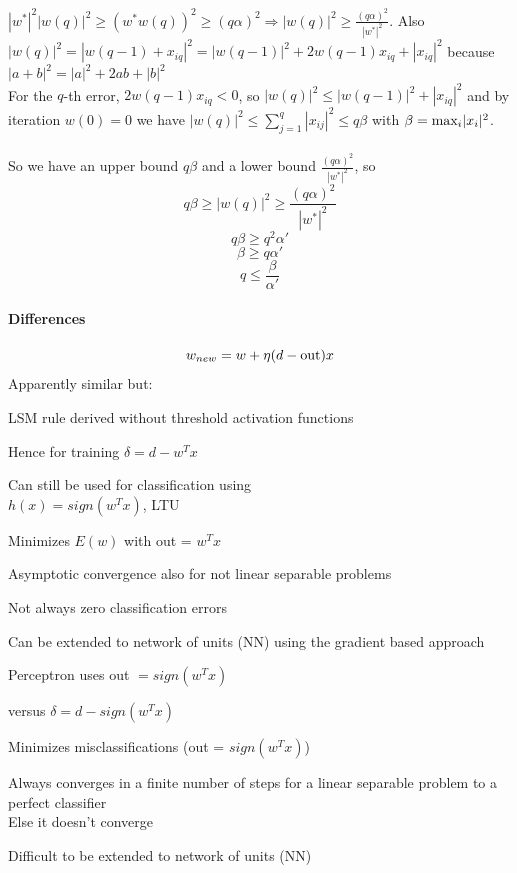 \documentclass[10pt]{report}
\begin{document}
$|w^*|^2|w(q)|^2 \geq (w^*w(q))^2 \geq (q\alpha)^2 \Rightarrow |w(q)|^2 \geq \frac{(q\alpha)^2}{|w^*|^2}$. Also $|w(q)|^2 = |w(q-1)+ x_{iq}|^2 = |w(q-1)|^2 + 2w(q-1)x_{iq} + |x_{iq}|^2$ because $|a + b|^2 = |a|^2 + 2ab + |b|^2$\\
For the $q$-th error, $2w(q-1)x_{iq} < 0$, so $|w(q)|^2 \leq |w(q-1)|^2 + |x_{iq}|^2$ and by iteration $w(0) = 0$ we have $|w(q)|^2 \leq \sum_{j=1}^q |x_{ij}|^2 \leq q\beta$ with $\beta = \hbox{max}_i |x_i|^2$.\\\\
So we have an upper bound $q\beta$ and a lower bound $\frac{(q\alpha)^2}{|w^*|^2}$, so $$q\beta\geq |w(q)|^2\geq \frac{(q\alpha)^2}{|w^*|^2}$$ $$q\beta\geq q^2\alpha'$$ $$\beta\geq q\alpha'$$ $$q \leq \frac{\beta}{\alpha'}$$
\paragraph{Differences}
	$$w_{new} = w + \eta(d-\hbox{out})x$$
Apparently similar but:
\begin{multicols}{2}
	\begin{list}{}{\textbf{LMS algorithm}}
		\item LSM rule derived without threshold activation functions
		\item Hence for training $\delta = d - w^Tx$
		\item Can still be used for classification using\\$h(x) = sign(w^T x)$, LTU
		\item Minimizes $E(w)$ with out = $w^Tx$
		\item Asymptotic convergence also for not linear separable problems
		\item Not always zero classification errors
		\item Can be extended to network of units (NN) using the gradient based approach
	\end{list}
	\begin{list}{}{\textbf{Perceptron learning algorithm}}
		\item Perceptron uses out $= sign(w^Tx)$
		\item versus $\delta = d - sign(w^Tx)$
		\item
		\item Minimizes misclassifications (out = $sign(w^Tx)$)
		\item Always converges in a finite number of steps for a linear separable problem to a perfect classifier\\
		Else it doesn't converge
		\item 
		\item Difficult to be extended to network of units (NN)
	\end{list}
\end{multicols}
\end{document}
